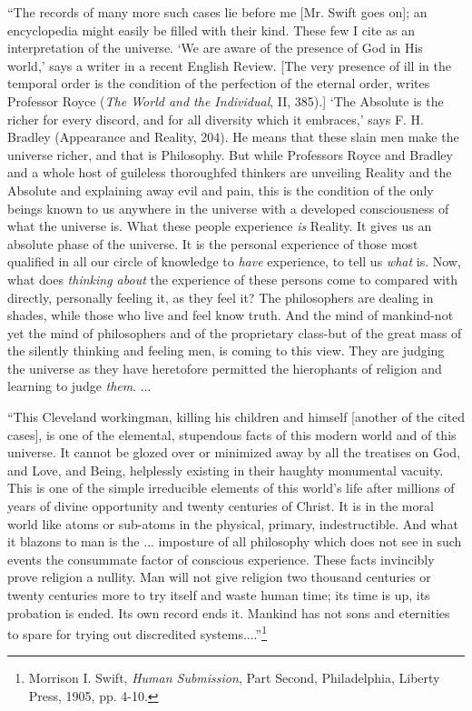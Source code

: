 \documentclass[]{article}
\begin{document}
``The records of many more such cases lie before me [Mr. Swift goes on];
an encyclopedia might easily be filled with their kind. These few I cite
as an interpretation of the universe. `We are aware of the presence of
God in His world,' says a writer in a recent English Review. [The very
presence of ill in the temporal order is the condition of the perfection
of the eternal order, writes Professor Royce (\emph{The World and the
Individual}, II, 385).] `The Absolute is the richer for every discord,
and for all diversity which it embraces,' says F. H. Bradley (Appearance
and Reality, 204). He means that these slain men make the universe
richer, and that is Philosophy. But while Professors Royce and Bradley
and a whole host of guileless thoroughfed thinkers are unveiling
Reality and the Absolute and explaining away evil and pain, this is the
condition of the only beings known to us anywhere in the universe with
a developed consciousness of what the universe is. What these people
experience \emph{is} Reality. It gives us an absolute phase of the universe. It
is the personal experience of those most qualified in all our circle
of knowledge to \emph{have} experience, to tell us \emph{what} is. Now, what does
\emph{thinking about} the experience of these persons come to compared with
directly, personally feeling it, as they feel it? The philosophers are
dealing in shades, while those who live and feel know truth. And the
mind of mankind-not yet the mind of philosophers and of the proprietary
class-but of the great mass of the silently thinking and feeling men,
is coming to this view. They are judging the universe as they have
heretofore permitted the hierophants of religion and learning to judge
\emph{them}. ...

``This Cleveland workingman, killing his children and himself [another
of the cited cases], is one of the elemental, stupendous facts of this
modern world and of this universe. It cannot be glozed over or minimized
away by all the treatises on God, and Love, and Being, helplessly
existing in their haughty monumental vacuity. This is one of the simple
irreducible elements of this world's life after millions of years of
divine opportunity and twenty centuries of Christ. It is in the moral
world like atoms or sub-atoms in the physical, primary, indestructible.
And what it blazons to man is the ... imposture of all philosophy
which does not see in such events the consummate factor of conscious
experience. These facts invincibly prove religion a nullity. Man will
not give religion two thousand centuries or twenty centuries more to try
itself and waste human time; its time is up, its probation is ended.
Its own record ends it. Mankind has not sons and eternities to spare for
trying out discredited systems....''\footnote{Morrison I. Swift, \emph{Human
Submission}, Part Second, Philadelphia, Liberty Press, 1905, pp. 4-10.}
\end{document}
